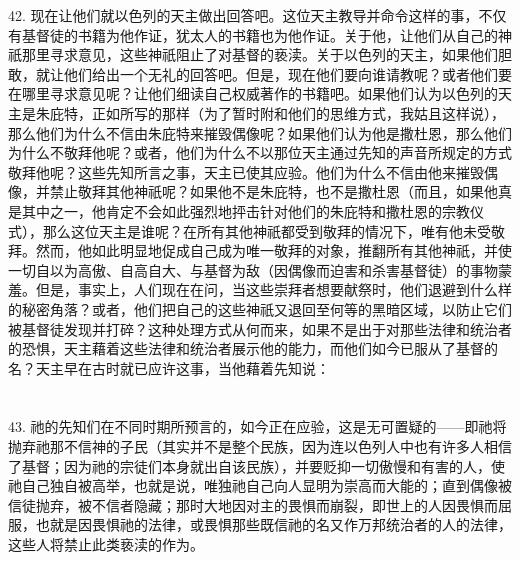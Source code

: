 42. 现在让他们就以色列的天主做出回答吧。这位天主教导并命令这样的事，不仅有基督徒的书籍为他作证，犹太人的书籍也为他作证。关于他，让他们从自己的神祇那里寻求意见，这些神祇阻止了对基督的亵渎。关于以色列的天主，如果他们胆敢，就让他们给出一个无礼的回答吧。但是，现在他们要向谁请教呢？或者他们要在哪里寻求意见呢？让他们细读自己权威著作的书籍吧。如果他们认为以色列的天主是朱庇特，正如所写的那样（为了暂时附和他们的思维方式，我姑且这样说），那么他们为什么不信由朱庇特来摧毁偶像呢？如果他们认为他是撒杜恩，那么他们为什么不敬拜他呢？或者，他们为什么不以那位天主通过先知的声音所规定的方式敬拜他呢？这些先知所言之事，天主已使其应验。他们为什么不信由他来摧毁偶像，并禁止敬拜其他神祇呢？如果他不是朱庇特，也不是撒杜恩（而且，如果他真是其中之一，他肯定不会如此强烈地抨击针对他们的朱庇特和撒杜恩的宗教仪式），那么这位天主是谁呢？在所有其他神祇都受到敬拜的情况下，唯有他未受敬拜。然而，他如此明显地促成自己成为唯一敬拜的对象，推翻所有其他神祇，并使一切自以为高傲、自高自大、与基督为敌（因偶像而迫害和杀害基督徒）的事物蒙羞。但是，事实上，人们现在在问，当这些崇拜者想要献祭时，他们退避到什么样的秘密角落？或者，他们把自己的这些神祇又退回至何等的黑暗区域，以防止它们被基督徒发现并打碎？这种处理方式从何而来，如果不是出于对那些法律和统治者的恐惧，天主藉着这些法律和统治者展示他的能力，而他们如今已服从了基督的名？天主早在古时就已应许这事，当他藉着先知说：\par



\section{}


\subsection{}

43. 祂的先知们在不同时期所预言的，如今正在应验，这是无可置疑的——即祂将抛弃祂那不信神的子民（其实并不是整个民族，因为连以色列人中也有许多人相信了基督；因为祂的宗徒们本身就出自该民族），并要贬抑一切傲慢和有害的人，使祂自己独自被高举，也就是说，唯独祂自己向人显明为崇高而大能的；直到偶像被信徒抛弃，被不信者隐藏；那时大地因对主的畏惧而崩裂，即世上的人因畏惧而屈服，也就是因畏惧祂的法律，或畏惧那些既信祂的名又作万邦统治者的人的法律，这些人将禁止此类亵渎的作为。\par


